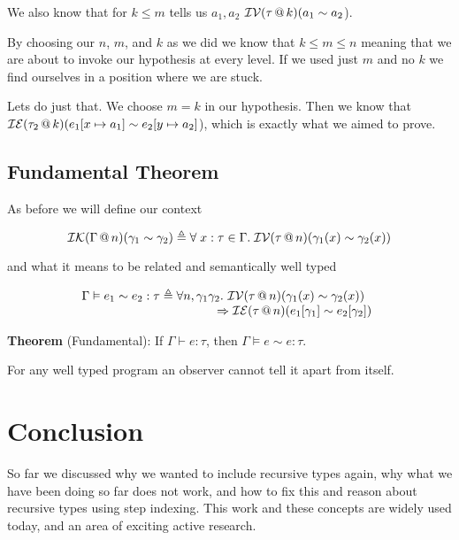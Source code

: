 \documentclass{lecturenotes}
\makeatletter
\newcommand{\spa}{\mkern5mu}
\newcommand{\inval}[4]{\ensuremath{\mathcal{I}\mathcal{V}(#1 \mkern3mu @ \mkern3mu #2)(#3 \sim #4})}
\newcommand{\inexpr}[4]{\ensuremath{\mathcal{I}\mathcal{E}(#1 \mkern3mu @ \mkern3mu #2)(#3 \sim #4})}
\newcommand{\incntxt}[4]{\ensuremath{\mathcal{I}\mathcal{K}(#1\mkern3mu @ \mkern3mu #2)(#3 \sim #4})}
\makeatother
\begin{document}
  We also know that for $k \leq m$ tells us $a_1, a_2$ \inval{\tau}{k}{a_1}{a_2}. 

  By choosing our $n$, $m$, and $k$ as we did we know that $k \leq m \leq n$ meaning that we are about to invoke our hypothesis at every level. 
    If we used just $m$ and no $k$ we find ourselves in a position where we are stuck.

  Lets do just that. We choose $m = k$ in our hypothesis. 
    Then we know that \inexpr{\tau_2}{k}{e_1[x \mapsto a_1]}{e_2[y \mapsto a_2]}, which is exactly what we aimed to prove.
    
\subsection{Fundamental Theorem}

As before we will define our context 

$$\incntxt{\Gamma}{n}{\gamma_1}{\gamma_2} \triangleq \forall \spa x : \tau \in \Gamma. \spa \inval{\tau}{n}{\gamma_1(x)}{\gamma_2(x)}$$

and what it means to be related and semantically well typed 

$$\begin{array}{r@{\;\triangleq\;}l} 
  \Gamma \vDash e_1 \sim e_2 : \tau 
    & \forall n, \gamma_1 \gamma_2.\, \hspace{-1.5em}
    \begin{array}[t]{l}\hspace{1.15em}
      \inval{\tau}{n}{\gamma_1(x)}{\gamma_2(x)} \\
      {} \Rightarrow \inexpr{\tau}{n}{e_1[\gamma_1]}{e_2[\gamma_2]}\\
    \end{array}  
\end{array}$$

\textbf{Theorem} (Fundamental): If $\Gamma \vdash e : \tau$, then $\Gamma \vDash e \sim e : \tau$. 

For any well typed program an observer cannot tell it apart from itself. 

\section{Conclusion}

So far we discussed why we wanted to include recursive types again, why what we have been doing so far does not work, and how to fix this and reason about recursive types using step indexing. 
  This work and these concepts are widely used today, and an area of exciting active research. 
\end{document}
